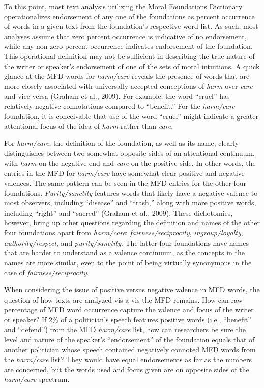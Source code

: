 \documentclass[english,,man]{apa6}
\begin{document}
To this point, most text analysis utilizing the Moral Foundations Dictionary operationalizes endorsement of any one of the foundations as percent occurrence of words in a given text from the foundation's respective word list. As such, most analyses assume that zero percent occurrence is indicative of no endorsement, while any non-zero percent occurrence indicates endorsement of the foundation. This operational definition may not be sufficient in describing the true nature of the writer or speaker's endorsement of one of the sets of moral intuitions. A quick glance at the MFD words for \emph{harm/care} reveals the presence of words that are more closely associated with universally accepted conceptions of \emph{harm} over \emph{care} and vice-versa (Graham et al., 2009). For example, the word \enquote{cruel} has relatively negative connotations compared to \enquote{benefit.} For the \emph{harm/care} foundation, it is conceivable that use of the word \enquote{cruel} might indicate a greater attentional focus of the idea of \emph{harm} rather than \emph{care}.

For \emph{harm/care}, the definition of the foundation, as well as its name, clearly distinguishes between two somewhat opposite sides of an attentional continuum, with \emph{harm} on the negative end and \emph{care} on the positive side. In other words, the entries in the MFD for \emph{harm/care} have somewhat clear positive and negative valences. The same pattern can be seen in the MFD entries for the other four foundations. \emph{Purity/sanctity} features words that likely have a negative valence to most observers, including \enquote{disease} and \enquote{trash,} along with more positive words, including \enquote{right} and \enquote{sacred} (Graham et al., 2009). These dichotomies, however, bring up other questions regarding the definition and names of the other four foundations apart from \emph{harm/care}: \emph{fairness/reciprocity}, \emph{ingroup/loyalty}, \emph{authority/respect}, and \emph{purity/sanctity}. The latter four foundations have names that are harder to understand as a valence continuum, as the concepts in the names are more similar, even to the point of being virtually synonymous in the case of \emph{fairness/reciprocity}.

When considering the issue of positive versus negative valence in MFD words, the question of how texts are analyzed vis-a-vis the MFD remains. How can raw percentage of MFD word occurrence capture the valence and focus of the writer or speaker? If 2\% of a politician's speech features positive words (i.e., \enquote{benefit} and \enquote{defend}) from the MFD \emph{harm/care} list, how can researchers be sure the level and nature of the speaker's \enquote{endorsement} of the foundation equals that of another politician whose speech contained negatively connoted MFD words from the \emph{harm/care} list? They would have equal endorsements as far as the numbers are concerned, but the words used and focus given are on opposite sides of the \emph{harm/care} spectrum.
\end{document}
